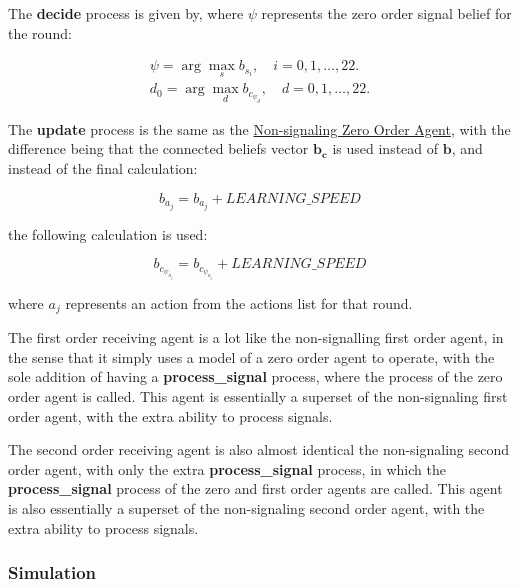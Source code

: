 The \textbf{decide} process is given by, where $\psi$ represents the zero order signal belief for the round:

\begin{equation*}
\begin{aligned}
    \psi = \arg\max_s b_{s_i}, \quad i = 0, 1, \ldots, 22. \\
    d_0 = \arg\max_d b_{c_{{\psi}_d}}, \quad d = 0, 1, \ldots, 22.
\end{aligned}
\end{equation*}

The \textbf{update} process is the same as the \hyperref[eq:zero-order-update]{Non-signaling Zero Order Agent}, with the difference being that the connected beliefs vector $\mathbf{b_c}$ is used instead of $\mathbf{b}$, and instead of the final calculation:

\[
    b_{a_j} = b_{a_j} + LEARNING\_SPEED 
\]

the following calculation is used:

\begin{equation*}
    b_{c_{\psi_{a_j}}} = b_{c_{\psi_{a_j}}} + LEARNING\_SPEED
\end{equation*}

where $a_j$ represents an action from the actions list for that round.


The first order receiving agent is a lot like the non-signalling first order agent, in the sense that it simply uses a model of a zero order agent to operate, with the sole addition of having a \textbf{process\_signal} process, where the  process of the zero order agent is called. This agent is essentially a superset of the non-signaling first order agent, with the extra ability to process signals.


The second order receiving agent is also almost identical the non-signaling second order agent, with only the extra \textbf{process\_signal} process, in which the \textbf{process\_signal} process of the zero and first order agents are called. This agent is also essentially a superset of the non-signaling second order agent, with the extra ability to process signals.

\subsubsection{Simulation}

